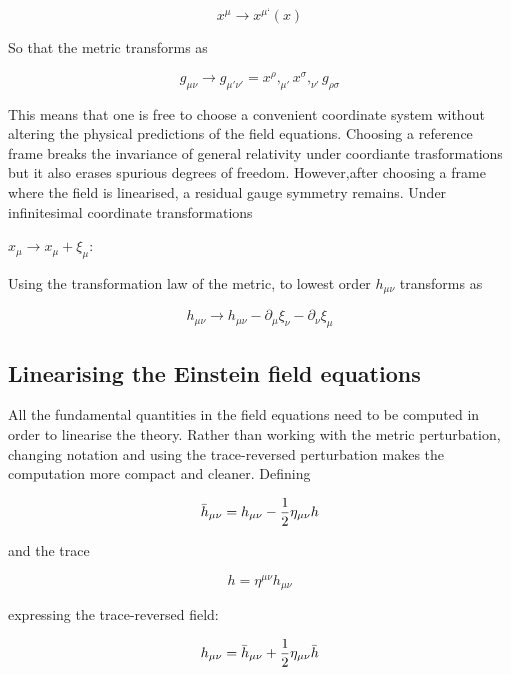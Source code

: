 \documentclass[binding=0.6cm, LaM]{sapthesis}
\begin{document}
		\begin{equation}
		x^{\mu} \rightarrow x^{\mu ‘}(x)
		\end{equation}

	So that the metric transforms as

		\begin{equation}
		g_{\mu\nu} \rightarrow g_{\mu' \nu'} = x^{\rho},_{\mu'}x^{\sigma},_{\nu'}g_{\rho \sigma}
		\end{equation}

	This means that one is free to choose a convenient coordinate system without 
	altering the physical predictions of the field equations.
	Choosing a reference frame breaks the invariance of general relativity under 
	coordiante trasformations but it also erases spurious degrees of freedom.
	However,after choosing a frame where the field is linearised, 
	a residual gauge symmetry remains. Under infinitesimal coordinate transformations
 
		$x_{\mu} \rightarrow x_{\mu} + \xi_{\mu}$:

	Using the transformation law of the metric, to lowest order $h_{\mu\nu}$ transforms as
			
		\[
		h_{\mu\nu} \rightarrow h_{\mu\nu} - \partial_{\mu}\xi_{\nu} - \partial_{\nu}\xi_{\mu}
		\]


\subsection{Linearising the Einstein field equations}

	All the fundamental quantities in the field equations need to be computed in order to linearise the theory.
	Rather than working with the metric perturbation, changing notation and using the trace-reversed perturbation 
	makes the computation more compact and cleaner. Defining
	
		\begin{equation}
		{\bar h}_{\mu\nu} = h_{\mu\nu} - {1 \over {2}}\eta_{\mu\nu}h  
		\end{equation}

	and the trace
	
		\begin{equation}
		h = \eta^{\mu\nu}h_{\mu\nu}
		\end{equation}

	expressing the trace-reversed field:

		\begin{equation}
		h_{\mu\nu} = {\bar h}_{\mu\nu} + {1 \over {2}}\eta_{\mu\nu}{\bar h}
		\end{equation}
\end{document}
